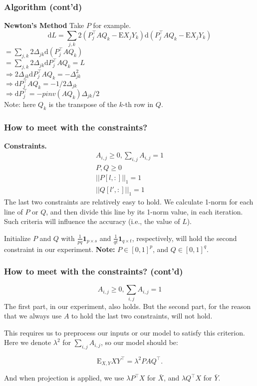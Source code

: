 \documentclass{beamer}
\begin{document}
\begin{frame}
\frametitle{Algorithm (cont'd)}
\textbf{Newton's Method} Take $P$ for example.
\begin{equation}
\nonumber
\text{d}L = \sum_{j,k}{2(P^\top_j A Q_k - \text{E}X_j Y_k) \text{d}(P^\top_j A Q_k - \text{E}X_j Y_k)}
\end{equation}
$ = \sum_{j,k} 2 \Delta_{jk} \text{d}(P^\top_j A Q_k)$ \\
$ = \sum_{j,k} 2 \Delta_{jk} \text{d}P^\top_j A Q_k = L$ \\
$ \Rightarrow 2\Delta_{jk} \text{d}P^\top_j A Q_k = -\Delta_{jk}^2 $ \\
$ \Rightarrow \text{d}P^\top_j A Q_k = -1/2\Delta_{jk} $ \\
$ \Rightarrow \text{d}P^\top_j = -pinv(A Q_k) \Delta_{jk}/2 $ 
\\
Note: here $Q_k$ is the transpose of the $k$-th row in $Q$.
\end{frame}

\begin{frame}
\frametitle{How to meet with the constraints?}
\textbf{Constraints.} 
\begin{eqnarray}
A_{i,j} \ge 0, \sum_{i,j}A_{i,j}=1 \\
P, Q \ge 0 \\
||P[l,:]||_1 = 1 \\
||Q[l',:]||_1=1
\end{eqnarray}
The last two constraints are relatively easy to hold. We calculate 1-norm for each line of $P$ or $Q$, and then divide this line by its 1-norm value, in each iteration. Such criteria will influence the accuracy (i.e., the value of $L$).

Initialize $P$ and $Q$ with $\frac{1}{pq} \textbf{1}_{p \times s}$ and $\frac{1}{qt} \textbf{1}_{q \times t}$, respectively, will hold the second constraint in our experiment. \textbf{Note:} $P \in [0, 1]^p$, and $Q \in [0, 1]^q$.

\end{frame}

\begin{frame}
\frametitle{How to meet with the constraints? (cont'd)}
\begin{equation}
\nonumber
A_{i,j} \ge 0, \sum_{i,j}A_{i,j}=1
\end{equation}
The first part, in our experiment, also holds. But the second part, for the reason that we always use $A$ to hold the last two constraints, will not hold.

This requires us to preprocess our inputs or our model to satisfy this criterion. Here we denote $\lambda^2$ for $\sum_{i,j}A_{i,j}$, so our model should be:

\begin{equation}
\text{E}_{X,Y}XY^\top = \lambda^2 P A Q^\top.
\end{equation}

And when projection is applied, we use $\lambda P^\top X$ for $\bar{X}$, and $\lambda Q^\top X$ for $\bar{Y}$.
\end{frame}
\end{document}
